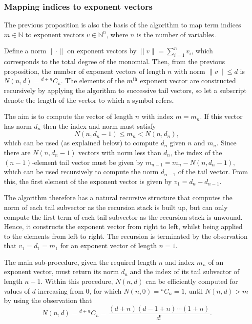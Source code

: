\subsubsection{Mapping indices to exponent vectors}

The previous proposition is also the basis of the algorithm to map
term indices $m \in \mathbb{N}$ to exponent vectors $v \in \mathbb{N}^n$,
where $n$ is the number of variables.

Define a norm $\|\cdot\|$ on exponent vectors by $\|v\| = \sum_{i=1}^n
v_i$, which corresponds to the total degree of the monomial.  Then,
from the previous proposition, the number of exponent vectors of
length $n$ with norm $\|v\| \leq d$ is $N(n,d) = {}^{d+n}C_n$.  The
elements of the $m^{\text{th}}$ exponent vector are constructed recursively by
applying the algorithm to successive tail vectors, so let a subscript
denote the length of the vector to which a symbol refers.

The aim is to compute the vector of length $n$ with index $m = m_n$.
If this vector has norm $d_n$ then the index and norm must satisfy
\[
  N(n,d_n-1) \leq m_n < N(n,d_n),
\]
which can be used (as explained below) to compute $d_n$ given $n$ and
$m_n$.  Since there are $N(n,d_n-1)$ vectors with norm less than
$d_n$, the index of the $(n-1)$-element tail vector must be given by
$m_{n-1} = m_n - N(n,d_n-1)$, which can be used recursively to compute
the norm $d_{n-1}$ of the tail vector.  From this, the first element
of the exponent vector is given by $v_1 = d_n - d_{n-1}$.

The algorithm therefore has a natural recursive structure that
computes the norm of each tail subvector as the recursion stack is
built up, but can only compute the first term of each tail subvector
as the recursion stack is unwound.  Hence, it constructs the exponent
vector from right to left, whilst being applied to the elements from
left to right.  The recursion is terminated by the observation that
$v_1 = d_1 = m_1$ for an exponent vector of length $n = 1$.

The main sub-procedure, given the required length $n$ and index $m_n$
of an exponent vector, must return its norm $d_n$ and the index of its
tail subvector of length $n-1$.  Within this procedure, $N(n,d)$ can
be efficiently computed for values of $d$ increasing from 0, for which
$N(n,0) = {}^nC_n = 1$, until $N(n,d) > m$ by using the observation
that
\[
   N(n,d) = {}^{d+n}C_n = \frac{(d+n)(d-1+n)\cdots(1+n)}{d!}.
\]
